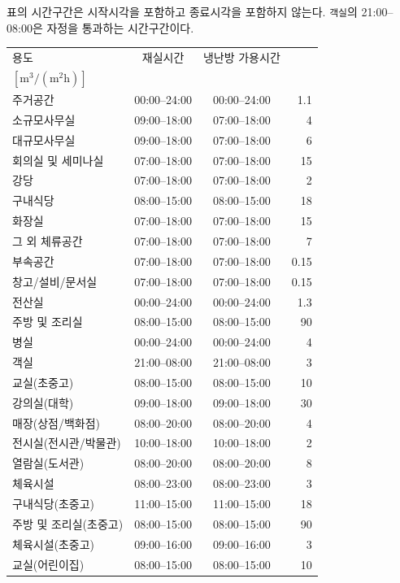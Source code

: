 표의 시간구간은 시작시각을 포함하고 종료시각을 포함하지 않는다.
\texttt{객실}의 21:00--08:00은 자정을 통과하는 시간구간이다.

\begin{defaulttable}
  \caption{내장 프로필 DB의 시간 및 외기량 값}
  \label{tab:profile-db-time}
  {\small
  \renewcommand{\arraystretch}{1.08}
  \begin{tabularx}{\textwidth}{Xccr}
    \toprule
    용도 & 재실시간 & 냉난방 가용시간 & \makecell[r]{\texttt{Ventilation}\\ $[\mathrm{m^3/(m^2h)}]$} \\
    \midrule
    주거공간             & 00:00--24:00 & 00:00--24:00 & 1.1 \\
    소규모사무실         & 09:00--18:00 & 07:00--18:00 & 4 \\
    대규모사무실         & 09:00--18:00 & 07:00--18:00 & 6 \\
    회의실 및 세미나실   & 07:00--18:00 & 07:00--18:00 & 15 \\
    강당                 & 07:00--18:00 & 07:00--18:00 & 2 \\
    구내식당             & 08:00--15:00 & 08:00--15:00 & 18 \\
    화장실               & 07:00--18:00 & 07:00--18:00 & 15 \\
    그 외 체류공간       & 07:00--18:00 & 07:00--18:00 & 7 \\
    부속공간             & 07:00--18:00 & 07:00--18:00 & 0.15 \\
    창고/설비/문서실     & 07:00--18:00 & 07:00--18:00 & 0.15 \\
    전산실               & 00:00--24:00 & 00:00--24:00 & 1.3 \\
    주방 및 조리실       & 08:00--15:00 & 08:00--15:00 & 90 \\
    병실                 & 00:00--24:00 & 00:00--24:00 & 4 \\
    객실                 & 21:00--08:00 & 21:00--08:00 & 3 \\
    교실(초중고)         & 08:00--15:00 & 08:00--15:00 & 10 \\
    강의실(대학)         & 09:00--18:00 & 09:00--18:00 & 30 \\
    매장(상점/백화점)    & 08:00--20:00 & 08:00--20:00 & 4 \\
    전시실(전시관/박물관) & 10:00--18:00 & 10:00--18:00 & 2 \\
    열람실(도서관)       & 08:00--20:00 & 08:00--20:00 & 8 \\
    체육시설             & 08:00--23:00 & 08:00--23:00 & 3 \\
    구내식당(초중고)     & 11:00--15:00 & 11:00--15:00 & 18 \\
    주방 및 조리실(초중고) & 08:00--15:00 & 08:00--15:00 & 90 \\
    체육시설(초중고)     & 09:00--16:00 & 09:00--16:00 & 3 \\
    교실(어린이집)       & 08:00--15:00 & 08:00--15:00 & 10 \\

    \bottomrule
  \end{tabularx}
  }
\end{defaulttable}

